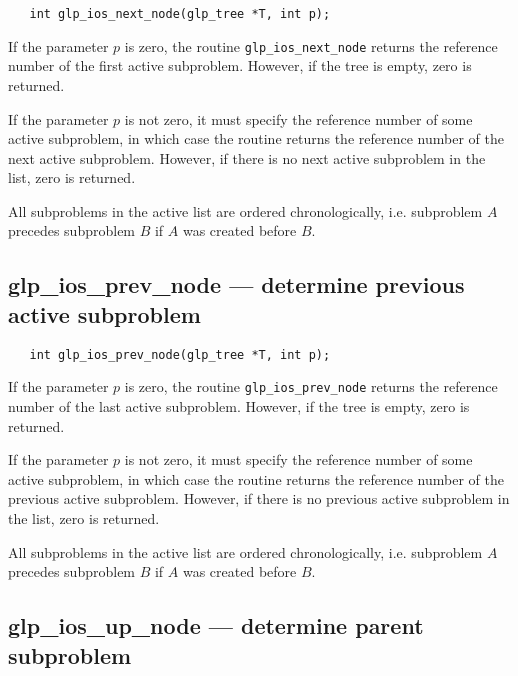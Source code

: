 \synopsis

\begin{verbatim}
   int glp_ios_next_node(glp_tree *T, int p);
\end{verbatim}

\returns

If the parameter $p$ is zero, the routine \verb|glp_ios_next_node|
returns the reference number of the first active subproblem. However,
if the tree is empty, zero is returned.

If the parameter $p$ is not zero, it must specify the reference number
of some active subproblem, in which case the routine returns the
reference number of the next active subproblem. However, if there is
no next active subproblem in the list, zero is returned.

All subproblems in the active list are ordered chronologically, i.e.
subproblem $A$ precedes subproblem $B$ if $A$ was created before $B$.

\newpage

\subsection{glp\_ios\_prev\_node --- determine previous active
subproblem}

\synopsis

\begin{verbatim}
   int glp_ios_prev_node(glp_tree *T, int p);
\end{verbatim}

\returns

If the parameter $p$ is zero, the routine \verb|glp_ios_prev_node|
returns the reference number of the last active subproblem. However, if
the tree is empty, zero is returned.

If the parameter $p$ is not zero, it must specify the reference number
of some active subproblem, in which case the routine returns the
reference number of the previous active subproblem. However, if there
is no previous active subproblem in the list, zero is returned.

All subproblems in the active list are ordered chronologically, i.e.
subproblem $A$ precedes subproblem $B$ if $A$ was created before $B$.

\subsection{glp\_ios\_up\_node --- determine parent subproblem}

